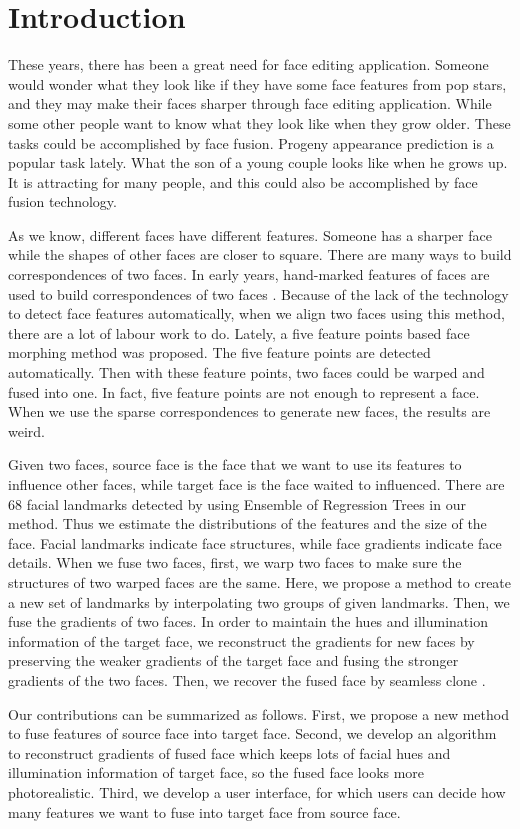 \section{Introduction}
These years, there has been a great need for face editing application. Someone would wonder what they look like if they have some face features from pop stars, and they may make their faces sharper through face editing application. While some other people want to know what they look like when they grow older. These tasks could be accomplished by face fusion. Progeny appearance prediction is a popular task lately. What the son of a young couple looks like when he grows up. It is attracting for many people, and this could also be accomplished by face fusion technology.

As we know, different faces have different features. Someone has a sharper face while the shapes of other faces are closer to square. There are many ways to build correspondences of two faces. In early years, hand-marked features of faces are used to build correspondences of two faces \cite{fbim}. Because of the lack of the technology to detect face features automatically, when we align two faces using this method, there are a lot of labour work to do. Lately, a five feature points based face morphing method \cite{mhf} was proposed. The five feature points are detected automatically. Then with these feature points, two faces could be warped and fused into one. In fact, five feature points are not enough to represent a face. When we use the sparse correspondences to generate new faces, the results are weird.

Given two faces, source face is the face that we want to use its features to influence other faces, while target face is the face waited to influenced. There are 68 facial landmarks detected by using Ensemble of Regression Trees \cite{fld} in our method. Thus we estimate the distributions of the features and the size of the face. Facial landmarks indicate face structures, while face gradients indicate face details. When we fuse two faces, first, we warp two faces to make sure the structures of two warped faces are the same. Here, we propose a method  to create a new set of landmarks by interpolating two groups of given landmarks. Then, we fuse the gradients of two faces. In order to maintain the hues and illumination information of the target face, we reconstruct the gradients for new faces by preserving the weaker gradients of the target face and fusing the stronger gradients of the two faces. Then, we recover the fused face by seamless clone \cite{pie}.

Our contributions can be summarized as follows. First, we propose a new method to fuse features of source face into target face. Second, we develop an algorithm to reconstruct gradients of fused face which keeps lots of facial hues and illumination information of target face, so the fused face looks more photorealistic. Third, we develop a user interface, for which users can decide how many features we want to fuse into target face from source face. 